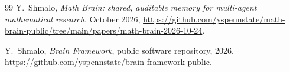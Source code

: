 \documentclass[11pt,reqno]{amsart}
\theoremstyle{definition}
\theoremstyle{remark}
\begin{document}
\begin{thebibliography}{99}
 Y.~Shmalo, \emph{Math Brain: shared, auditable memory for multi-agent mathematical research}, October 2026, \url{https://github.com/yspennstate/math-brain-public/tree/main/papers/math-brain-2026-10-24}.

 Y.~Shmalo, \emph{Brain Framework}, public software repository, 2026, \url{https://github.com/yspennstate/brain-framework-public}.

\end{thebibliography}
\end{document}
